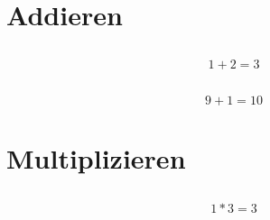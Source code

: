 \documentclass[utf]{uhb-inf}
\begin{document}
\section{Addieren}

\subsection{}

\[ 1 + 2 = 3 \]

\subsection{}

\[ 9 + 1 = 10 \]

\section{Multiplizieren}

\subsection{}

\[ 1 * 3 = 3 \]
\end{document}
